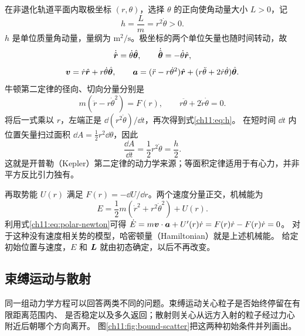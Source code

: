 在非退化轨道平面内取极坐标 $(r,\theta)$，选择 $\theta$ 的正向使角动量大小 $L>0$，记
\begin{equation}\label{ch11:eq:h}
 h=\frac Lm=r^2\dot\theta>0.
\end{equation}
$h$ 是单位质量角动量，量纲为 $\mathrm{m^2/s}$。极坐标的两个单位矢量也随时间转动，故
\[
 \dot{\hat{\bm{r}}}=\dot\theta\hat{\bm{\theta}},\qquad
 \dot{\hat{\bm{\theta}}}=-\dot\theta\hat{\bm{r}},
\]
\[
 \bm{v}=\dot r\hat{\bm{r}}+r\dot\theta\hat{\bm{\theta}},\qquad
 \bm{a}=(\ddot r-r\dot\theta^2)\hat{\bm{r}}
 +(r\ddot\theta+2\dot r\dot\theta)\hat{\bm{\theta}}.
\]
牛顿第二定律的径向、切向分量分别是
\begin{equation}\label{ch11:eq:polar-newton}
 m(\ddot r-r\dot\theta^2)=F(r),\qquad
 r\ddot\theta+2\dot r\dot\theta=0.
\end{equation}
将后一式乘以 $r$，左端正是 $\dd(r^2\dot\theta)/\dd t$，再次得到式\eqref{ch11:eq:h}。
在短时间 $\dd t$ 内位置矢量扫过面积 $\dd A=\tfrac12r^2\dd\theta$，因此
\begin{equation}\label{ch11:eq:area-law}
 \frac{\dd A}{\dd t}=\frac12r^2\dot\theta=\frac h2.
\end{equation}
这就是开普勒（Kepler）第二定律的动力学来源；等面积定律适用于有心力，并非平方反比引力独有。

再取势能 $U(r)$ 满足 $F(r)=-\dd U/\dd r$。两个速度分量正交，机械能为
\begin{equation}\label{ch11:eq:energy-original}
 E=\frac12m(\dot r^2+r^2\dot\theta^2)+U(r).
\end{equation}
利用式\eqref{ch11:eq:polar-newton}可得
$\dot E=m\bm{v}\cdot\bm{a}+U'(r)\dot r=F(r)\dot r-F(r)\dot r=0$。
对于这种没有速度相关势的模型，哈密顿量（Hamiltonian）就是上述机械能。
给定初始位置与速度，$E$ 和 $\bm{L}$ 就由初态确定，以后不再改变。

\subsection{束缚运动与散射}
同一组动力学方程可以回答两类不同的问题。束缚运动关心粒子是否始终停留在有限距离范围内、
是否稳定以及多久返回；散射则关心从远方入射的粒子经过力心附近后朝哪个方向离开。
图\ref{ch11:fig:bound-scatter}把这两种初始条件并列画出。


